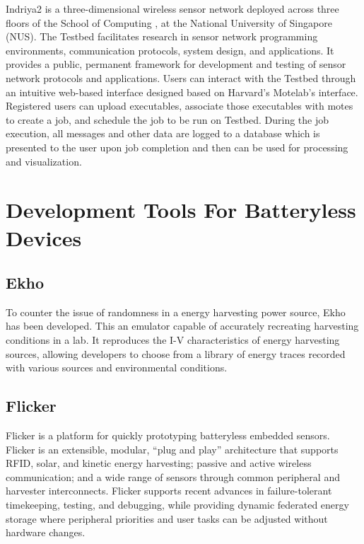 Indriya2 \cite{indriya2} is a three-dimensional wireless sensor network deployed across three floors of the School of Computing , at the National University of Singapore (NUS). The Testbed facilitates research in sensor network programming environments, communication protocols, system design, and applications. It provides a public, permanent framework for development and testing of sensor network protocols and applications. Users can interact with the Testbed through an intuitive web-based interface designed based on Harvard's Motelab's interface. Registered users can upload executables, associate those executables with motes to create a job, and schedule the job to be run on Testbed. During the job execution, all messages and other data are logged to a database which is presented to the user upon job completion and then can be used for processing and visualization. 

\section{Development Tools For Batteryless Devices}


\subsection{Ekho}

To counter the issue of randomness in a energy harvesting power source, Ekho \cite{ekho} has been developed. This an emulator capable of accurately recreating harvesting conditions in a lab. It reproduces the I-V characteristics of energy harvesting sources, allowing developers to choose from a library of energy traces recorded with various sources and environmental conditions.

\subsection{Flicker}
Flicker \cite{flicker} is a platform for quickly prototyping batteryless embedded sensors. Flicker is an extensible, modular, “plug and play” architecture that supports RFID, solar, and kinetic energy harvesting; passive and active wireless communication; and a wide range of sensors through common peripheral and harvester interconnects. Flicker supports recent advances in failure-tolerant timekeeping, testing, and debugging, while providing dynamic federated energy storage where peripheral priorities and user tasks can be adjusted without hardware changes.

